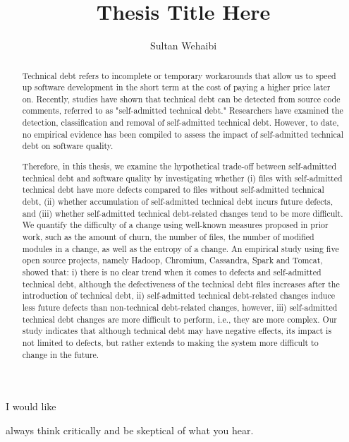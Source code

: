 \documentclass[12pt]{report}
\author{Sultan Wehaibi}
\title {Thesis Title Here}
\begin{document}
\begin{abstract}
	
	
Technical debt refers to incomplete or temporary workarounds that allow us to speed up software development in the short term at the cost of paying a higher price later on. Recently, studies have shown that technical debt can be detected from source code comments, referred to as "self-admitted technical debt." Researchers have examined the detection, classification and removal of self-admitted technical debt. However, to date, no empirical evidence has been compiled to assess the impact of self-admitted technical debt on software quality.

Therefore, in this thesis, we examine the hypothetical trade-off between self-admitted technical debt and software quality by investigating whether (i) files with self-admitted technical debt have more defects compared to files without self-admitted technical debt, (ii) whether accumulation of self-admitted technical debt incurs future defects, and (iii) whether self-admitted technical debt-related changes tend to be more difficult. We quantify the difficulty of a change using well-known measures proposed in prior work, such as the amount of churn, the number of files, the number of modified modules in a change, as well as the entropy of a change. An empirical study using five open source projects, namely Hadoop, Chromium, Cassandra, Spark and Tomcat, showed that: i) there is no clear trend when it comes to defects and self-admitted technical debt, although the defectiveness of the technical debt files increases after the introduction of technical debt, ii) self-admitted technical debt-related changes induce less future defects than non-technical debt-related changes, however, iii) self-admitted technical debt changes are more difficult to perform, i.e., they are more complex. Our study indicates that although technical debt may have negative effects, its impact is not limited to defects, but rather extends to making the system more difficult to change in the future.


\end{abstract}



\begin{acknowledgments}

I would like 

\end{acknowledgments}



\begin{dedication}
	\begin{flushright}
	always think critically and be skeptical of what you hear.\\
	\end{flushright}
\end{dedication}
\end{document}
